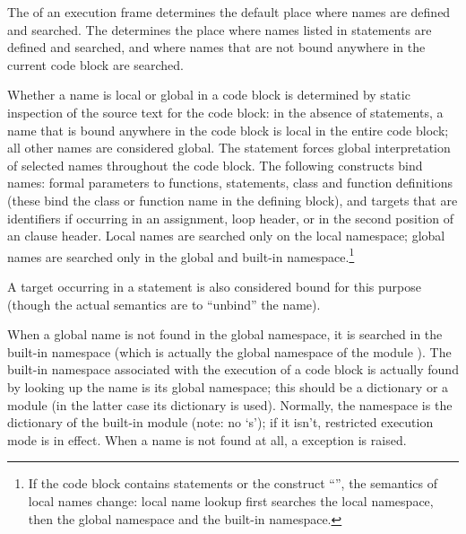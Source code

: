 The  of an execution frame determines the default
place where names are defined and searched.  The  determines the place where names listed in 
statements are defined and searched, and where names that are not
bound anywhere in the current code block are searched.

Whether a name is local or global in a code block is determined by
static inspection of the source text for the code block: in the
absence of  statements, a name that is bound anywhere
in the code block is local in the entire code block; all other names
are considered global.  The  statement forces global
interpretation of selected names throughout the code block.  The
following constructs bind names: formal parameters to functions,
 statements, class and function definitions (these
bind the class or function name in the defining block), and targets
that are identifiers if occurring in an assignment,  loop
header, or in the second position of an  clause
header.  Local names are searched only on the local namespace; global
names are searched only in the global and built-in
namespace.\footnote{
If the code block contains  statements or the construct
``'', the semantics of local names change:
local name lookup first searches the local namespace, then the global
namespace and the built-in namespace.}

A target occurring in a  statement is also considered bound
for this purpose (though the actual semantics are to ``unbind'' the
name).

When a global name is not found in the global namespace, it is
searched in the built-in namespace (which is actually the global
namespace of the module ).  The built-in namespace
associated with the execution of a code block is actually found by
looking up the name  is its global namespace; this
should be a dictionary or a module (in the latter case its dictionary
is used).  Normally, the  namespace is the
dictionary of the built-in module  (note: no `s');
if it isn't, restricted execution mode is in effect.  When a name is
not found at all, a  exception is raised.%

